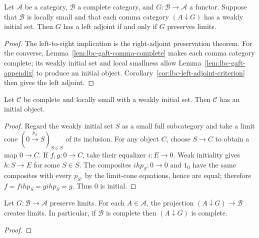 \begin{theorem}
\label{thm:lbc-gaft-appendix-restatement}
Let $\mathcal A$ be a category, $\mathcal B$ a complete category, and
$G:\mathcal B\to\mathcal A$ a functor. Suppose that $\mathcal B$ is locally
small and that each comma category $(A\downarrow G)$ has a weakly initial set.
Then $G$ has a left adjoint if and only if $G$ preserves limits.
\notready
\end{theorem}
\begin{proof}
The left-to-right implication is the right-adjoint preservation theorem. For the
converse, Lemma~\ref{lem:lbc-gaft-comma-complete} makes each comma category
complete; its weakly initial set and local smallness allow Lemma~\ref{lem:lbc-gaft-appendix}
to produce an initial object. Corollary~\ref{cor:lbc-left-adjoint-criterion} then
gives the left adjoint.
\end{proof}

\begin{lemma}
\label{lem:lbc-gaft-appendix}
Let $\mathcal C$ be complete and locally small with a weakly initial set. Then
$\mathcal C$ has an initial object.
\end{lemma}
\begin{proof}
Regard the weakly initial set $S$ as a small full subcategory and take a limit
cone $(0\xrightarrow{p_S}S)_{S\in S}$ of its inclusion. For any object $C$,
choose $S\to C$ to obtain a map $0\to C$. If $f,g:0\to C$, take their
equalizer $i:E\to0$. Weak initiality gives $h:S\to E$ for some $S\in S$.
The composites $ihp_S:0\to0$ and $1_0$ have the same composites with every
$p_{S'}$ by the limit-cone equations, hence are equal; therefore
$f=fihp_S=gihp_S=g$. Thus $0$ is initial.
\end{proof}

\begin{lemma}
\label{lem:lbc-gaft-comma-complete}
Let $G:\mathcal B\to\mathcal A$ preserve limits. For each $A\in\mathcal A$,
the projection $(A\downarrow G)\to\mathcal B$ creates limits. In particular,
if $\mathcal B$ is complete then $(A\downarrow G)$ is complete.
\notready
\end{lemma}
\begin{proof}
\notready
\end{proof}
